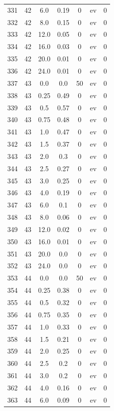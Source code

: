 \documentclass[12pt,a4paper]{article}
\begin{document}
\begin{tabular}{r|cccccc}
	331 & 42 & 6.0 & 0.19 & 0 & ev & 0 \\
	332 & 42 & 8.0 & 0.15 & 0 & ev & 0 \\
	333 & 42 & 12.0 & 0.05 & 0 & ev & 0 \\
	334 & 42 & 16.0 & 0.03 & 0 & ev & 0 \\
	335 & 42 & 20.0 & 0.01 & 0 & ev & 0 \\
	336 & 42 & 24.0 & 0.01 & 0 & ev & 0 \\
	337 & 43 & 0.0 & 0.0 & 50 & ev & 0 \\
	338 & 43 & 0.25 & 0.49 & 0 & ev & 0 \\
	339 & 43 & 0.5 & 0.57 & 0 & ev & 0 \\
	340 & 43 & 0.75 & 0.48 & 0 & ev & 0 \\
	341 & 43 & 1.0 & 0.47 & 0 & ev & 0 \\
	342 & 43 & 1.5 & 0.37 & 0 & ev & 0 \\
	343 & 43 & 2.0 & 0.3 & 0 & ev & 0 \\
	344 & 43 & 2.5 & 0.27 & 0 & ev & 0 \\
	345 & 43 & 3.0 & 0.25 & 0 & ev & 0 \\
	346 & 43 & 4.0 & 0.19 & 0 & ev & 0 \\
	347 & 43 & 6.0 & 0.1 & 0 & ev & 0 \\
	348 & 43 & 8.0 & 0.06 & 0 & ev & 0 \\
	349 & 43 & 12.0 & 0.02 & 0 & ev & 0 \\
	350 & 43 & 16.0 & 0.01 & 0 & ev & 0 \\
	351 & 43 & 20.0 & 0.0 & 0 & ev & 0 \\
	352 & 43 & 24.0 & 0.0 & 0 & ev & 0 \\
	353 & 44 & 0.0 & 0.0 & 50 & ev & 0 \\
	354 & 44 & 0.25 & 0.38 & 0 & ev & 0 \\
	355 & 44 & 0.5 & 0.32 & 0 & ev & 0 \\
	356 & 44 & 0.75 & 0.35 & 0 & ev & 0 \\
	357 & 44 & 1.0 & 0.33 & 0 & ev & 0 \\
	358 & 44 & 1.5 & 0.21 & 0 & ev & 0 \\
	359 & 44 & 2.0 & 0.25 & 0 & ev & 0 \\
	360 & 44 & 2.5 & 0.2 & 0 & ev & 0 \\
	361 & 44 & 3.0 & 0.2 & 0 & ev & 0 \\
	362 & 44 & 4.0 & 0.16 & 0 & ev & 0 \\
	363 & 44 & 6.0 & 0.09 & 0 & ev & 0 \\

\end{tabular}
\end{document}
